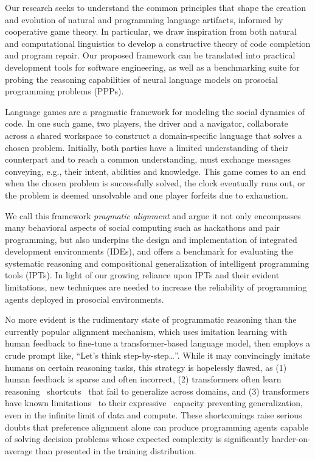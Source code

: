 \documentclass[sigplan,screen]{acmart}
\begin{document}
Our research seeks to understand the common principles that shape the creation and evolution of natural and programming language artifacts, informed by cooperative game theory. In particular, we draw inspiration from both natural and computational linguistics to develop a constructive theory of code completion and program repair. Our proposed framework can be translated into practical development tools for software engineering, as well as a benchmarking suite for probing the reasoning capabilities of neural language models on prosocial programming problems (PPPs).

Language games are a pragmatic framework for modeling the social dynamics of code. In one such game, two players, the driver and a navigator, collaborate across a shared workspace to construct a domain-specific language that solves a chosen problem. Initially, both parties have a limited understanding of their counterpart and to reach a common understanding, must exchange messages conveying, e.g., their intent, abilities and knowledge. This game comes to an end when the chosen problem is successfully solved, the clock eventually runs out, or the problem is deemed unsolvable and one player forfeits due to exhaustion.

We call this framework \emph{pragmatic alignment} and argue it not only encompasses many behavioral aspects of social computing such as hackathons and pair programming, but also underpins the design and implementation of integrated development environments (IDEs), and offers a benchmark for evaluating the systematic reasoning and compositional generalization of intelligent programming tools (IPTs). In light of our growing reliance upon IPTs and their evident limitations, new techniques are needed to increase the reliability of programming agents deployed in prosocial environments.

No more evident is the rudimentary state of programmatic reasoning than the currently popular alignment mechanism, which uses imitation learning with human feedback to fine-tune a transformer-based language model, then employs a crude prompt like, ``Let's think step-by-step\ldots''. While it may convincingly imitate humans on certain reasoning tasks, this strategy is hopelessly flawed, as (1) human feedback is sparse and often incorrect, (2) transformers often learn reasoning~\cite{dziri2023faith} shortcuts~\cite{liu2022transformers} that fail to generalize across domains, and (3) transformers have known limitations~\cite{merrill2022saturated} to their expressive~\cite{chiang2023tighter} capacity preventing generalization, even in the infinite limit of data and compute. These shortcomings raise serious doubts that preference alignment alone can produce programming agents capable of solving decision problems whose expected complexity is significantly harder-on-average than presented in the training distribution.
\end{document}
